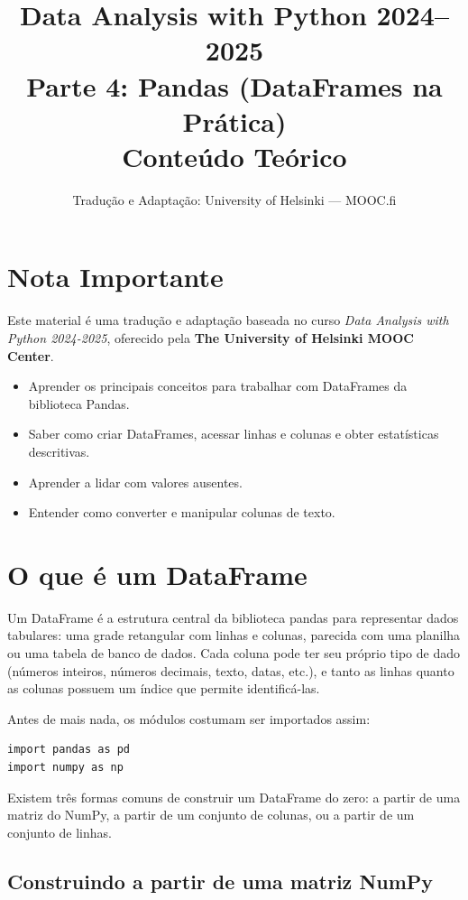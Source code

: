 \documentclass[11pt,a4paper]{article}
\title{\textbf{Data Analysis with Python 2024--2025}\\Parte 4: Pandas (DataFrames na Prática)\\\large Conteúdo Teórico}
\author{Tradução e Adaptação: University of Helsinki --- MOOC.fi}
\date{}
\begin{document}
\maketitle

\section*{Nota Importante}
Este material é uma tradução e adaptação baseada no curso \textit{Data Analysis with Python 2024-2025}, oferecido pela \textbf{The University of Helsinki MOOC Center}.

\begin{objetivos}
\begin{itemize}
    \item Aprender os principais conceitos para trabalhar com DataFrames da biblioteca Pandas.
    \item Saber como criar DataFrames, acessar linhas e colunas e obter estatísticas descritivas.
    \item Aprender a lidar com valores ausentes.
    \item Entender como converter e manipular colunas de texto.
\end{itemize}
\end{objetivos}

\tableofcontents
\newpage

\section{O que é um DataFrame}

Um DataFrame é a estrutura central da biblioteca pandas para representar dados tabulares: uma grade retangular com linhas e colunas, parecida com uma planilha ou uma tabela de banco de dados. Cada coluna pode ter seu próprio tipo de dado (números inteiros, números decimais, texto, datas, etc.), e tanto as linhas quanto as colunas possuem um índice que permite identificá-las.

Antes de mais nada, os módulos costumam ser importados assim:
\begin{lstlisting}
import pandas as pd
import numpy as np
\end{lstlisting}

Existem três formas comuns de construir um DataFrame do zero: a partir de uma matriz do NumPy, a partir de um conjunto de colunas, ou a partir de um conjunto de linhas.

\subsection{Construindo a partir de uma matriz NumPy}
\end{document}
